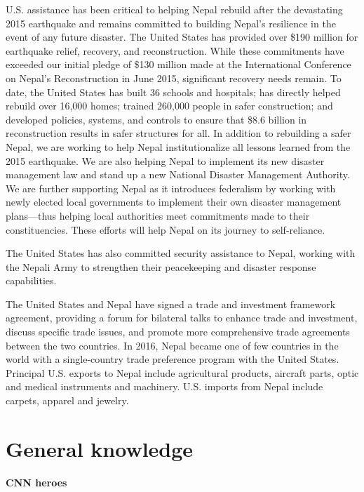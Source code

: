 \documentclass[
]{book}
\begin{document}
U.S. assistance has been critical to helping Nepal rebuild after the devastating 2015 earthquake and remains committed to building Nepal's resilience in the event of any future disaster. The United States has provided over \$190 million for earthquake relief, recovery, and reconstruction. While these commitments have exceeded our initial pledge of \$130 million made at the International Conference on Nepal's Reconstruction in June 2015, significant recovery needs remain. To date, the United States has built 36 schools and hospitals; has directly helped rebuild over 16,000 homes; trained 260,000 people in safer construction; and developed policies, systems, and controls to ensure that \$8.6 billion in reconstruction results in safer structures for all. In addition to rebuilding a safer Nepal, we are working to help Nepal institutionalize all lessons learned from the 2015 earthquake. We are also helping Nepal to implement its new disaster management law and stand up a new National Disaster Management Authority. We are further supporting Nepal as it introduces federalism by working with newly elected local governments to implement their own disaster management plans---thus helping local authorities meet commitments made to their constituencies. These efforts will help Nepal on its journey to self-reliance.

The United States has also committed security assistance to Nepal, working with the Nepali Army to strengthen their peacekeeping and disaster response capabilities.

The United States and Nepal have signed a trade and investment framework agreement, providing a forum for bilateral talks to enhance trade and investment, discuss specific trade issues, and promote more comprehensive trade agreements between the two countries. In 2016, Nepal became one of few countries in the world with a single-country trade preference program with the United States. Principal U.S. exports to Nepal include agricultural products, aircraft parts, optic and medical instruments and machinery. U.S. imports from Nepal include carpets, apparel and jewelry.

\hypertarget{general-knowledge}{%
\chapter{General knowledge}\label{general-knowledge}}

\textbf{CNN heroes}
\end{document}
